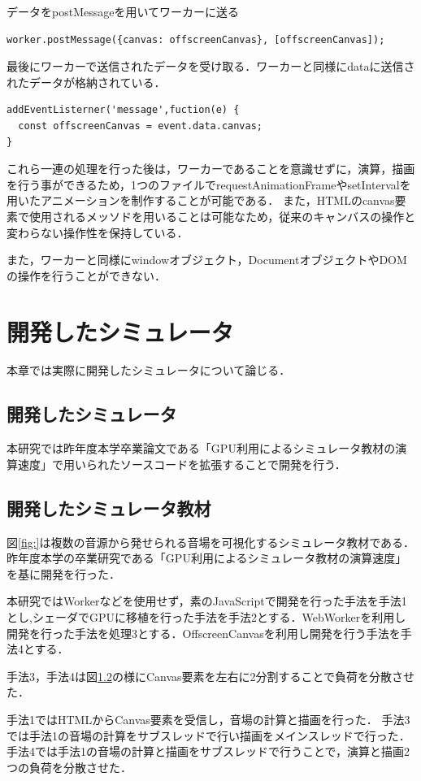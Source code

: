 \documentclass[a4j,12pt]{jsarticle}
\begin{document}
 データをpostMessageを用いてワーカーに送る
 \begin{lstlisting}[basicstyle=\ttfamily\footnotesize, frame=single]
worker.postMessage({canvas: offscreenCanvas}, [offscreenCanvas]);
 \end{lstlisting}
 
 最後にワーカーで送信されたデータを受け取る．ワーカーと同様にdataに送信されたデータが格納されている．
  \begin{lstlisting}[basicstyle=\ttfamily\footnotesize, frame=single]
 addEventListerner('message',fuction(e) { 
  const offscreenCanvas = event.data.canvas;
}
 \end{lstlisting} 
これら一連の処理を行った後は，ワーカーであることを意識せずに，演算，描画を行う事ができるため，1つのファイルでrequestAnimationFrameやsetIntervalを用いたアニメーションを制作することが可能である．
また，HTMLのcanvas要素で使用されるメッソドを用いることは可能なため，従来のキャンバスの操作と変わらない操作性を保持している．

また，ワーカーと同様にwindowオブジェクト，DocumentオブジェクトやDOMの操作を行うことができない．
\newpage
\section{開発したシミュレータ}
本章では実際に開発したシミュレータについて論じる．
\subsection{開発したシミュレータ}
本研究では昨年度本学卒業論文である「GPU利用によるシミュレータ教材の演算速度」で用いられたソースコードを拡張することで開発を行う．

\subsection{開発したシミュレータ教材}
図\ref{fig:}は複数の音源から発せられる音場を可視化するシミュレータ教材である．
昨年度本学の卒業研究である「GPU利用によるシミュレータ教材の演算速度」を基に開発を行った．

本研究ではWorkerなどを使用せず，素のJavaScriptで開発を行った手法を手法1とし,シェーダでGPUに移植を行った手法を手法2とする．WebWorkerを利用し開発を行った手法を処理3とする．OffscreenCanvasを利用し開発を行う手法を手法4とする．

手法3，手法4は図\ref{}の様にCanvas要素を左右に2分割することで負荷を分散させた．

手法1ではHTMLからCanvas要素を受信し，音場の計算と描画を行った．
手法3では手法1の音場の計算をサブスレッドで行い描画をメインスレッドで行った．
手法4では手法1の音場の計算と描画をサブスレッドで行うことで，演算と描画2つの負荷を分散させた．
\end{document}

